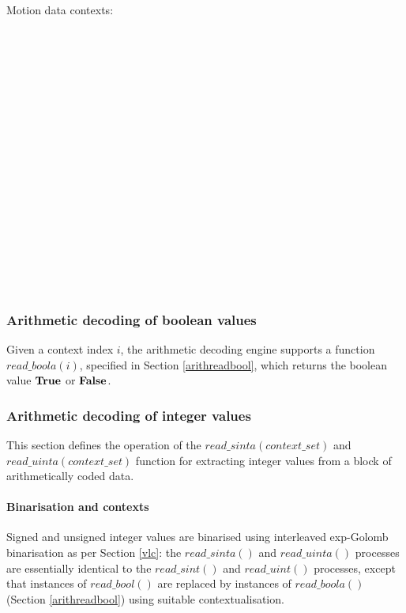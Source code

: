 Motion data contexts:

\SBSplitFollowOne\\
\SBSplitFollowTwo\\
\SBSplitData\\
\PredModeOne\\
\PredModeTwo\\
\BlockGlobal\\
\VectorFollowOne\\
\VectorFollowTwo\\
\VectorFollowThree\\
\VectorFollowFour\\
\VectorFollowFivePlus\\
\VectorData\\
\VectorSign\\
\DCFollowOne\\
\DCFollowTwoPlus\\
\DCData\\
\DCSign\\

\subsubsection{Arithmetic decoding of boolean values}

Given a context index $i$, the arithmetic decoding engine supports a function
$read\_boola(i)$, specified in Section \ref{arithreadbool}, which returns the 
boolean value $\text{\bf{True}}$ or $\text{\bf{False}}$.

\subsubsection{Arithmetic decoding of integer values}

\label{arithreadint}

This section defines the operation of the $read\_sinta(context\_set)$ and
$read\_uinta(context\_set)$ function
 for extracting integer values from a block of arithmetically coded data.

\paragraph{Binarisation and contexts \\}

Signed and unsigned integer values are binarised using interleaved exp-Golomb
 binarisation as per Section \ref{vlc}: the $read\_sinta()$ and $read\_uinta()$
processes are essentially identical to the 
$read\_sint()$ and $read\_uint()$ processes, except that instances of $read\_bool()$ are replaced
by instances of $read\_boola()$ (Section \ref{arithreadbool}) using suitable contextualisation. 

